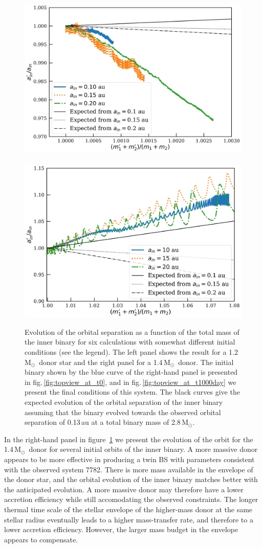\documentclass[twocolumn]{aastex62}
\newcommand{\MSun}{\mbox{M$_\odot$}}
\begin{document}
\begin{figure}[ht!]
  \includegraphics[width=0.51\linewidth]{fig_orbital_evolution_for_12MSun.pdf}
~  \includegraphics[width=0.49\linewidth]{fig_orbital_evolution_for_14MSun.pdf}
  \caption{Evolution of the orbital separation as a function of the
    total mass of the inner binary for six calculations with somewhat
    different initial conditions (see the legend). The left panel
    shows the result for a 1.2\,\MSun\, donor star and the right panel
    for a 1.4\,\MSun\, donor. The initial binary shown by the blue
    curve of the right-hand panel is presented in
    fig.\,\ref{fig:topview_at_t0}, and in
    fig.\,\ref{fig:topview_at_t1000day} we present the final
    conditions of this system.  The black curves give the expected
    evolution of the orbital separation of the inner binary assuming
    that the binary evolved towards the observed orbital separation of
    0.13\,au at a total binary mass of 2.8\,\MSun.
\label{fig:mass_vs_semimajor_axis}}
\end{figure}

In the right-hand panel in figure~\ref{fig:mass_vs_semimajor_axis} we
present the evolution of the orbit for the 1.4\,\MSun\, donor for
several initial orbits of the inner binary. A more massive donor
appears to be more effective in producing a twin BS with parameters
consistent with the observed system 7782. There is more mass available
in the envelope of the donor star, and the orbital evolution of the
inner binary matches better with the anticipated evolution.  A more
massive donor may therefore have a lower accretion efficiency while
still accomodating the observed constraints.  The longer thermal time
scale of the stellar envelope of the higher-mass donor at the same
stellar radius eventually leads to a higher mass-transfer rate, and
therefore to a lower accretion efficiency. However, the larger mass
budget in the envelope appears to compensate.
\end{document}
